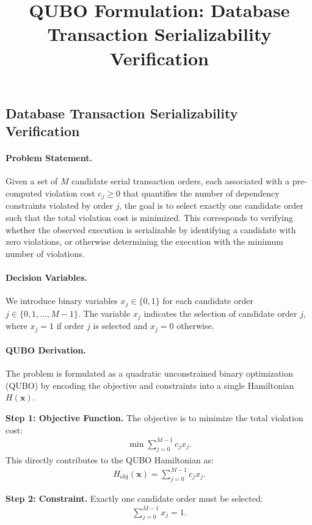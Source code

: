 \documentclass[12pt]{article}
\title{QUBO Formulation: Database Transaction Serializability Verification}
\date{}
\begin{document}
\maketitle

\subsection*{Database Transaction Serializability Verification}

\paragraph{Problem Statement.}
Given a set of $M$ candidate serial transaction orders, each associated with a pre-computed violation cost $c_j \ge 0$ that quantifies the number of dependency constraints violated by order $j$, the goal is to select exactly one candidate order such that the total violation cost is minimized. This corresponds to verifying whether the observed execution is serializable by identifying a candidate with zero violations, or otherwise determining the execution with the minimum number of violations.

\paragraph{Decision Variables.}
We introduce binary variables $x_j \in \{0,1\}$ for each candidate order $j \in \{0, 1, \dots, M-1\}$. The variable $x_j$ indicates the selection of candidate order $j$, where $x_j = 1$ if order $j$ is selected and $x_j = 0$ otherwise.

\paragraph{QUBO Derivation.}
The problem is formulated as a quadratic unconstrained binary optimization (QUBO) by encoding the objective and constraints into a single Hamiltonian $H(\mathbf{x})$.

\textbf{Step 1: Objective Function.}
The objective is to minimize the total violation cost:
\begin{align}
    \min \sum_{j=0}^{M-1} c_j x_j.
\end{align}
This directly contributes to the QUBO Hamiltonian as:
\begin{align}
    H_{\text{obj}}(\mathbf{x}) = \sum_{j=0}^{M-1} c_j x_j.
\end{align}

\textbf{Step 2: Constraint.}
Exactly one candidate order must be selected:
\begin{align}
    \sum_{j=0}^{M-1} x_j = 1.
\end{align}
\end{document}
